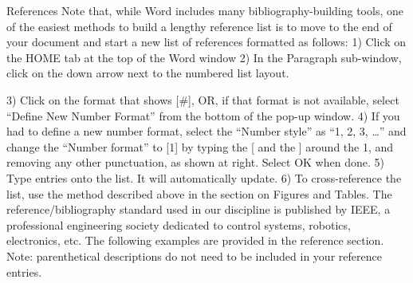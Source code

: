 References
Note that, while Word includes many bibliography-building tools, one of the easiest methods to build a lengthy reference list is to move to the end of your document and start a new list of references formatted as follows:
1)  Click on the HOME tab at the top of the Word window
2)  In the Paragraph sub-window, click on the down arrow next to the numbered list layout.


3)  Click on the format that shows [#], OR, if that format is not available, select “Define New Number Format” from the bottom of the pop-up window.
4)  If you had to define a new number format, select the “Number style” as “1, 2, 3, …” and change the “Number format” to [1] by typing the [ and the ] around the 1, and removing any other punctuation, as shown at right.  Select OK when done.
5)  Type entries onto the list.  It will automatically update.
6)  To cross-reference the list, use the method described above in the section on Figures and Tables.
The reference/bibliography standard used in our discipline is published by IEEE, a professional engineering society dedicated to control systems, robotics, electronics, etc.  The following examples are provided in the reference section.  Note: parenthetical descriptions do not need to be included in your reference entries. 


